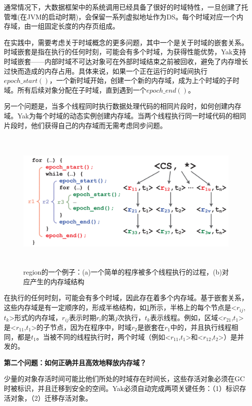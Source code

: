 通常情况下，大数据框架中的系统调用已经具备了很好的时域特性，一旦创建了托管堆(在JVM的启动时期)，会保留一系列虚拟地址作为DS。每个时域对应一个内存域，由一组固定长度的内存页组成。

在实践中，需要考虑关于时域概念的更多问题，其中一个是关于时域的嵌套关系。时域嵌套是指在执行的任何时刻，可能会有多个时域，为获得性能优势，Yak支持时域嵌套——内部时域不可达对象可在外部时域结束之前被回收，避免了内存增长过快而造成的内存占用。具体来说，如果一个正在运行的时域间执行$epoch\_start()$，一个新时域开始，创建一个新的内存域，成为上个时域的子时域。所有后续对象分配在子时域，直到遇到一个$epoch\_end()$。

另一个问题是，当多个线程同时执行数据处理代码的相同片段时，如何创建内存域。Yak为每个时域的动态实例创建内存域。当两个线程执行同一时域代码的相同片段时，他们获得自己的内存域而无需考虑同步问题。


\begin{figure}[h]
    \centering
    \includegraphics[width=12cm,height=7cm]{figure/epoch.png}
    \caption{
        region的一个例子：(a)一个简单的程序被多个线程执行的过程，(b)对应产生的内存域结构
    }
    \label{img2}
\end{figure}
在执行的任何时刻，可能会有多个时域，因此存在着多个内存域。基于嵌套关系，这些内存域是有一定顺序的，形成半格结构，如\ref {img2}所示，半格上的每个节点是<$r_{ij}$,$t_k$>形式的内存域，$r_{ij}$表示时期$r_i$的第$j$次执行，$t_k$表示线程。例如，区域<$r_{21}$,$t_1$>是<$r_{11}$,$t_1$>的子节点，因为在程序中，时域$r_2$是嵌套在$r_1$中的，并且执行线程相同，都是$t_1$。当被不同的线程执行时，两个时域（例如<$r_{11}$,$t_1$>和<$r_{12}$,$t_2$>）是并发的。

{\bfseries 第二个问题：如何正确并且高效地释放内存域？}

少量的对象存活时间可能比他们所处的时域存在时间长，这些存活对象必须在GC时被标识，并且迁移到安全的空间。Yak必须自动完成两项关键任务：（1）标识存活对象，（2）迁移存活对象。

